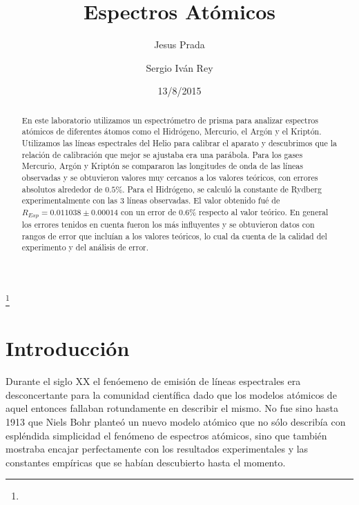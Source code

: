 \documentclass[%
 reprint,
 amsmath,amssymb,
 aps,
]{revtex4-1}
\begin{document}

\title{Espectros Atómicos}%
\thanks{}%

\author{Jesus Prada}
\author{Sergio Iv\'an Rey}%
%

\date{13/8/2015}%

\begin{abstract}
En este laboratorio utilizamos un espectrómetro de prisma para analizar espectros atómicos de diferentes átomos como el Hidrógeno, Mercurio, el Argón y el Kriptón. Utilizamos las líneas espectrales del Helio para calibrar el aparato y descubrimos que la relación de calibración que mejor se ajustaba era una parábola. Para los gases Mercurio, Argón y Kriptón se compararon las longitudes de onda de las líneas observadas y se obtuvieron valores muy cercanos a los valores teóricos, con errores absolutos alrededor de $0.5\%$. Para el Hidrógeno, se calculó la constante de Rydberg experimentalmente con las 3 líneas observadas. El valor obtenido fué de $R_{Exp} = 0.011038 \pm 0.00014$ con un error de $0.6\%$ respecto al valor teórico. En general los errores tenidos en cuenta fueron los más influyentes y se obtuvieron datos con rangos de error que incluían a los valores teóricos, lo cual da cuenta de la calidad del experimento y del análisis de error.\\
\end{abstract}


\maketitle


\section{\label{sec:level1}Introducci\'on}

Durante el siglo XX el fenóemeno de emisión de líneas espectrales era desconcertante para la comunidad científica dado que los modelos atómicos de aquel entonces fallaban rotundamente en describir el mismo. No fue sino hasta 1913 que Niels Bohr planteó un nuevo modelo atómico que no sólo describía con espléndida simplicidad el fenómeno de espectros atómicos, sino que también mostraba encajar perfectamente con los resultados experimentales y las constantes empíricas que se habían descubierto hasta el momento. \\ 
\end{document}
